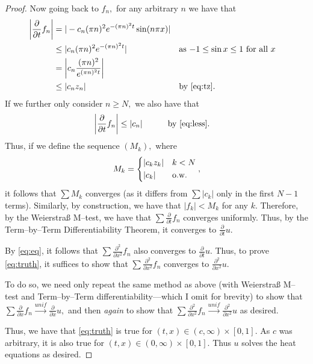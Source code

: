\documentclass[10pt]{article}
\begin{document}
\begin{proof}
    Now going back to $f_n,$ for any arbitrary $n$ we have that
    \begin{alignat*}{2}
        \left | \frac{\partial }{\partial t}f_n \right | &= |-c_n(\pi n)^2e^{-(\pi n)^2t}\sin(n\pi x)|\\
        &\le |c_n(\pi n)^2e^{-(\pi n)^2t}| && \text{as $-1 \le \sin x \le 1$ for all $x$}\\
        &= \left |c_n\frac{(\pi n)^2}{e^{(\pi n)^2t}} \right |\\
        &\le |c_n z_n| && \text{by \eqref{eq:tz}.}
    \end{alignat*}
    If we further only consider $n \ge N,$ we also have that
    \begin{alignat*}{2}
        \left | \frac{\partial }{\partial t}f_n \right | &\le |c_n| \qquad&& \text{by \eqref{eq:less}.}
    \end{alignat*}
    Thus, if we define the sequence $(M_k),$ where
    \begin{equation*}
        M_k = \begin{cases*}
            |c_k z_k| & $k < N$\\
            |c_k| &o.w.
        \end{cases*},
    \end{equation*}
    it follows that $\sum M_k$ converges (as it differs from $\sum |c_k|$ only in the first $N-1$ terms). Similarly, by construction, we have that $|f_k| < M_k$ for any $k.$ Therefore, by the Weierstraß M--test, we have that $\sum \frac{\partial}{\partial t}f_n$ converges uniformly. Thus, by the Term--by--Term Differentiability Theorem, it converges to $\frac{\partial}{\partial t} u.$

    By \eqref{eq:eq}, it follows that $\sum \frac{\partial^2}{\partial x^2} f_n$ also converges to $\frac{\partial}{\partial t} u.$ Thus, to prove \eqref{eq:truth}, it suffices to show that $\sum \frac{\partial^2}{\partial x^2} f_n$ converges to $\frac{\partial^2}{\partial x^2} u.$

    To do so, we need only repeat the same method as above (with Weierstraß M--test and Term--by--Term differentiability---which I omit for brevity) to show that $\sum \frac{\partial}{\partial x} f_n \stackrel{unif}{\to} \frac{\partial}{\partial x} u,$ and then  \emph{again} to show that $\sum \frac{\partial^2}{\partial x^2} f_n \stackrel{unif}{\to} \frac{\partial^2}{\partial x^2} u$ as desired.

    Thus, we have that \eqref{eq:truth} is true for $(t,x)\in (c, \infty)\times [0,1].$ As $c$ was arbitrary, it is also true for $(t,x)\in (0, \infty)\times [0,1].$ Thus $u$ solves the heat equations as desired.
\end{proof}
\end{document}
